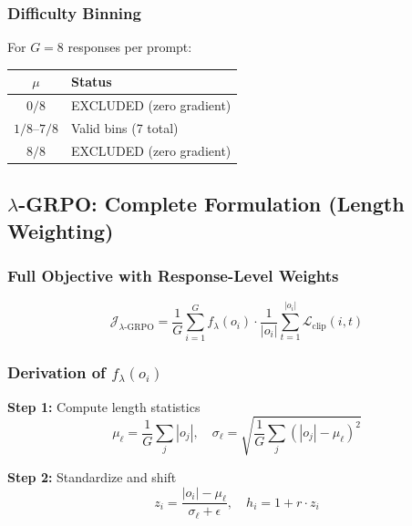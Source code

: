 \documentclass[11pt,a4paper]{article}
\begin{document}
\subsubsection{Difficulty Binning}

For $G = 8$ responses per prompt:
\begin{center}
\begin{tabular}{@{}cl@{}}
\toprule
$\mu$ & \textbf{Status} \\
\midrule
$0/8$ & EXCLUDED (zero gradient) \\
$1/8 \text{--} 7/8$ & Valid bins (7 total) \\
$8/8$ & EXCLUDED (zero gradient) \\
\bottomrule
\end{tabular}
\end{center}

\subsection{$\lambda$-GRPO: Complete Formulation (Length Weighting)}

\subsubsection{Full Objective with Response-Level Weights}

\begin{equation}
\mathcal{J}_{\lambda\text{-GRPO}} = \frac{1}{G} \sum_{i=1}^{G} f_\lambda(o_i) \cdot \frac{1}{|o_i|} \sum_{t=1}^{|o_i|} \mathcal{L}_{\text{clip}}(i,t)
\end{equation}

\subsubsection{Derivation of $f_\lambda(o_i)$}

\textbf{Step 1:} Compute length statistics
\begin{equation}
\mu_\ell = \frac{1}{G}\sum_j |o_j|, \quad \sigma_\ell = \sqrt{\frac{1}{G}\sum_j (|o_j| - \mu_\ell)^2}
\end{equation}

\textbf{Step 2:} Standardize and shift
\begin{equation}
z_i = \frac{|o_i| - \mu_\ell}{\sigma_\ell + \epsilon}, \quad h_i = 1 + r \cdot z_i
\end{equation}
\end{document}
